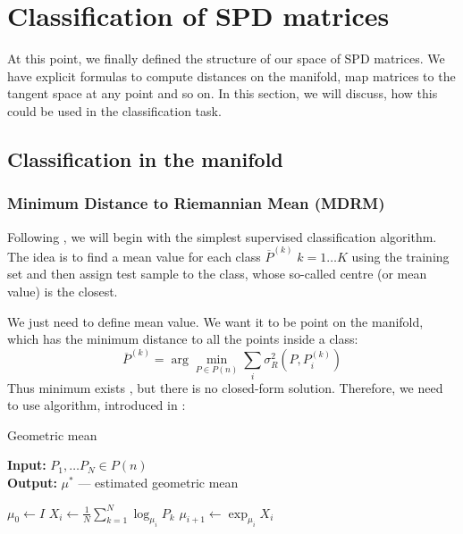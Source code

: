 \documentclass[12pt]{extarticle}
\theoremstyle{definition}
\theoremstyle{remark}
\begin{document}
	
	
	\newpage
	
	\section{Classification of SPD matrices}
	At this point, we finally defined the structure of our space of SPD matrices. We have explicit formulas to compute distances on the manifold, map matrices to the tangent space at any point and so on. In this section, we will discuss, how this could be used in the classification task. 
	
	\subsection{Classification in the manifold}\label{sec:classification}
	\subsubsection*{Minimum Distance to Riemannian Mean (MDRM)}
	Following \cite{Barachant2010}, we will begin with the simplest supervised classification algorithm. The idea is to find a mean value for each class $ \overline{P}^{(k)} \;k = 1\dots K $ using the training set and then assign test sample to the class, whose so-called centre (or mean value) is the closest.
	
	We just need to define mean value. We want it to be point on the manifold, which has the minimum distance to all the points inside a class:
	\begin{equation*}
	\overline{P}^{(k)}  = \arg\min_{P\in P(n)}\sum_i \sigma_R^2(P, P_i^{(k)})
	\end{equation*}
	Thus minimum exists \cite{Barachant2010}, but there is no closed-form solution. Therefore, we need to use algorithm, introduced in \cite{Fletcher2004}:
	\begin{algorithm}
		\caption{Geometric mean}
		\label{alg:geom_mean}
		\textbf{Input:} $P_1,\dots P_N \in P(n)$ \\
		\textbf{Output:} $\mu^*$ --- estimated geometric mean 
		\begin{algorithmic}[1]
			\State $\mu_0 \gets I$
			\State $X_i \gets \frac{1}{N}\sum_{k=1}^{N}\log_{\mu_i}P_k$
			\State $\mu_{i+1} \gets \exp_{\mu_i}X_i$
			\EndWhile
		\end{algorithmic}
	\end{algorithm}
	
\end{document}
